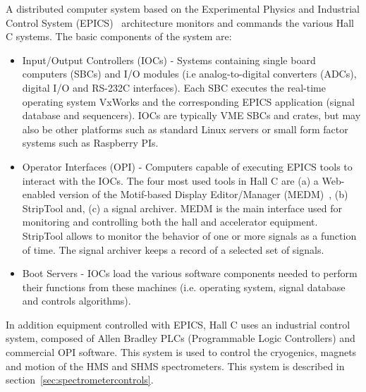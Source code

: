 A distributed computer system
based on the 
Experimental Physics and Industrial Control System 
(EPICS)~\cite{EPICSwww}
 architecture monitors and commands
the various Hall C systems. The basic components of the system are:
\begin{itemize}
\item Input/Output Controllers (IOCs) - Systems containing single
board computers (SBCs) and I/O modules
(i.e analog-to-digital converters (ADCs), digital I/O and RS-232C interfaces).
Each SBC executes the real-time operating system VxWorks and the corresponding EPICS application (signal database
and sequencers).  IOCs are typically VME SBCs and crates, but may also
be other platforms such as standard Linux servers or small form factor
systems such as Raspberry PIs.
\item Operator Interfaces (OPI) - Computers capable of executing
EPICS tools to interact with the IOCs.
The four most used tools in Hall C are (a)
a Web-enabled version of the Motif-based Display Editor/Manager (MEDM)~\cite{MEDMwww}, 
(b) StripTool and, (c) a signal archiver.
MEDM is the main interface used for monitoring and controlling both the hall and accelerator
equipment. StripTool allows to monitor 
the behavior of one or more signals as a function of time. 
The signal archiver keeps a record of a selected set of signals.
\item Boot Servers - IOCs load the various
software components needed to perform their functions from these machines (i.e. operating system,
signal database and controls algorithms).
\end{itemize}

In addition equipment controlled with EPICS, Hall C uses an industrial
control system, composed of Allen Bradley PLCs (Programmable Logic
Controllers) and commercial OPI software.  This system is used to
control the cryogenics, magnets and motion of the HMS and SHMS
spectrometers.  This system is described in
section~\ref{sec:spectrometercontrols}. 

